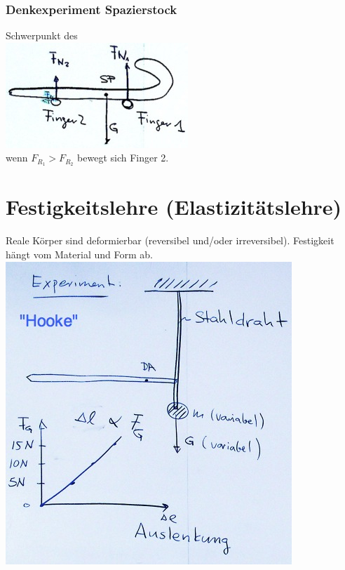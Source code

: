 \subsubsection{Denkexperiment Spazierstock}
Schwerpunkt des \\
\includegraphics{Bild39} \\
wenn $F_{R_1} > F_{R_2}$ bewegt sich Finger 2.

\section{Festigkeitslehre (Elastizitätslehre)}
Reale Körper sind deformierbar (reversibel und/oder irreversibel). Festigkeit hängt vom Material und Form ab. \\
\includegraphics{Bild40}

